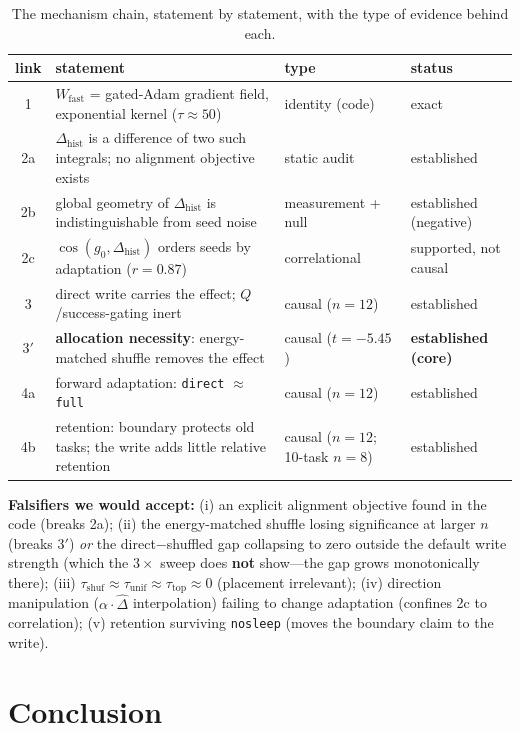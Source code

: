 \documentclass{article} %
\begin{document}
\begin{table}[h]
\centering
\small
\begin{tabular}{@{}cp{}p{}p{}@{}}
\toprule
link & statement & type & status \\
\midrule
1 & $W_{\mathrm{fast}}$ = gated-Adam gradient field, exponential kernel ($\tau\approx50$) & identity (code) & exact \\
2a & $\Delta_{\mathrm{hist}}$ is a difference of two such integrals; no alignment objective exists & static audit & established \\
2b & global geometry of $\Delta_{\mathrm{hist}}$ is indistinguishable from seed noise & measurement + null & established (negative) \\
2c & $\cos(g_0, \Delta_{\mathrm{hist}})$ orders seeds by adaptation ($r{=}0.87$) & correlational & supported, not causal \\
3 & direct write carries the effect; $Q$/success-gating inert & causal ($n{=}12$) & established \\
3$'$ & \textbf{allocation necessity}: energy-matched shuffle removes the effect & causal ($t{=}{-}5.45$) & \textbf{established (core)} \\
4a & forward adaptation: \texttt{direct} $\approx$ \texttt{full} & causal ($n{=}12$) & established \\
4b & retention: boundary protects old tasks; the write adds little relative retention & causal ($n{=}12$; 10-task $n{=}8$) & established \\
\bottomrule
\end{tabular}
\caption{The mechanism chain, statement by statement, with the type of evidence behind each.}
\label{tab:chain}
\end{table}

\textbf{Falsifiers we would accept:} (i) an explicit alignment objective found in the code (breaks 2a); (ii) the energy-matched shuffle losing significance at larger $n$ (breaks 3$'$) \emph{or} the direct$-$shuffled gap collapsing to zero outside the default write strength (which the $3\times$ sweep does \textbf{not} show---the gap grows monotonically there); (iii) $\tau_{\mathrm{shuf}} \approx \tau_{\mathrm{unif}} \approx \tau_{\mathrm{top}} \approx 0$ (placement irrelevant); (iv) direction manipulation ($\alpha\cdot\hat{\Delta}$ interpolation) failing to change adaptation (confines 2c to correlation); (v) retention surviving \texttt{nosleep} (moves the boundary claim to the write).

\section{Conclusion}
\end{document}
